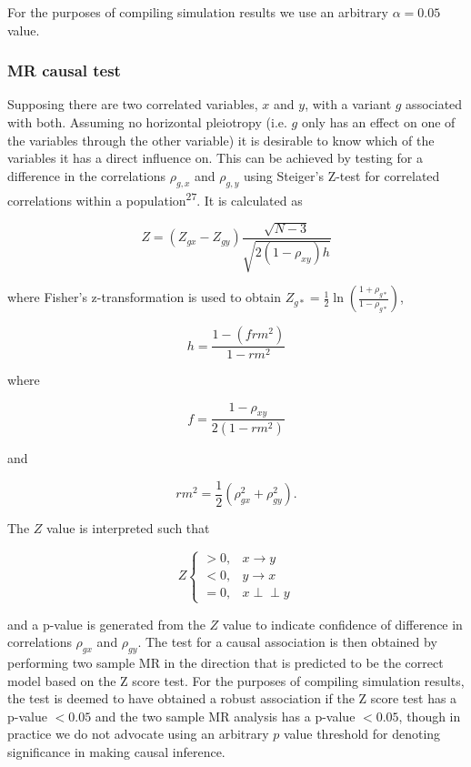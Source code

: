 \documentclass[]{article}
\begin{document}
For the purposes of compiling simulation results we use an arbitrary
\(\alpha = 0.05\) value.

\subsubsection{MR causal test}\label{mr-causal-test}

Supposing there are two correlated variables, \(x\) and \(y\), with a
variant \(g\) associated with both. Assuming no horizontal pleiotropy
(i.e. \(g\) only has an effect on one of the variables through the other
variable) it is desirable to know which of the variables it has a direct
influence on. This can be achieved by testing for a difference in the
correlations \(\rho_{g, x}\) and \(\rho_{g, y}\) using Steiger's Z-test
for correlated correlations within a population\textsuperscript{27}. It
is calculated as

\[
Z = (Z_{gx} - Z_{gy}) \frac{\sqrt{N-3}}{\sqrt{2(1-\rho_{xy})h}}
\]

where Fisher's z-transformation is used to obtain
\(Z_{g*} = \frac{1}{2} \ln \left ( \frac{1+\rho_{g*}}{1-\rho_{g*}} \right )\),

\[
h = \frac{1 - (frm^2)} {1 - rm^2}
\]

where

\[
f = \frac{1 - \rho_{xy}}{2(1 - rm^2)}
\]

and

\[
rm^2 = \frac{1}{2}(\rho_{gx}^2 + \rho_{gy}^2).
\]

The \(Z\) value is interpreted such that

\[
Z \left\{
\begin{array}{ll}
> 0, & x \to y\\
< 0, & y \to x\\
= 0, & x \perp\!\!\!\perp y 
\end{array} \right.
\]

and a p-value is generated from the \(Z\) value to indicate confidence
of difference in correlations \(\rho_{gx}\) and \(\rho_{gy}\). The test
for a causal association is then obtained by performing two sample MR in
the direction that is predicted to be the correct model based on the Z
score test. For the purposes of compiling simulation results, the test
is deemed to have obtained a robust association if the Z score test has
a p-value \(< 0.05\) and the two sample MR analysis has a p-value
\(< 0.05\), though in practice we do not advocate using an arbitrary
\(p\) value threshold for denoting significance in making causal
inference.
\end{document}
